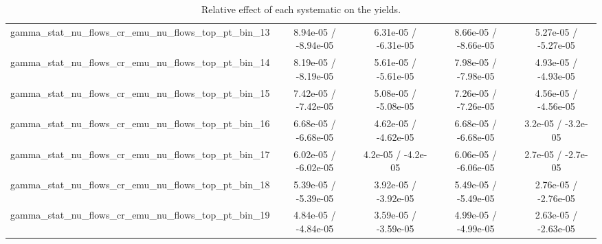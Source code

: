 \documentclass[10pt]{article}
\begin{document}
\begin{table}[htbp]
\begin{center}
\begin{tabular}{|c|c|c|c|c|}
  gamma_stat_nu_flows_cr_emu_nu_flows_top_pt_bin_13 & 8.94e-05 / -8.94e-05 & 6.31e-05 / -6.31e-05 & 8.66e-05 / -8.66e-05 & 5.27e-05 / -5.27e-05 \\ 
  gamma_stat_nu_flows_cr_emu_nu_flows_top_pt_bin_14 & 8.19e-05 / -8.19e-05 & 5.61e-05 / -5.61e-05 & 7.98e-05 / -7.98e-05 & 4.93e-05 / -4.93e-05 \\ 
  gamma_stat_nu_flows_cr_emu_nu_flows_top_pt_bin_15 & 7.42e-05 / -7.42e-05 & 5.08e-05 / -5.08e-05 & 7.26e-05 / -7.26e-05 & 4.56e-05 / -4.56e-05 \\ 
  gamma_stat_nu_flows_cr_emu_nu_flows_top_pt_bin_16 & 6.68e-05 / -6.68e-05 & 4.62e-05 / -4.62e-05 & 6.68e-05 / -6.68e-05 & 3.2e-05 / -3.2e-05 \\ 
  gamma_stat_nu_flows_cr_emu_nu_flows_top_pt_bin_17 & 6.02e-05 / -6.02e-05 & 4.2e-05 / -4.2e-05 & 6.06e-05 / -6.06e-05 & 2.7e-05 / -2.7e-05 \\ 
  gamma_stat_nu_flows_cr_emu_nu_flows_top_pt_bin_18 & 5.39e-05 / -5.39e-05 & 3.92e-05 / -3.92e-05 & 5.49e-05 / -5.49e-05 & 2.76e-05 / -2.76e-05 \\ 
  gamma_stat_nu_flows_cr_emu_nu_flows_top_pt_bin_19 & 4.84e-05 / -4.84e-05 & 3.59e-05 / -3.59e-05 & 4.99e-05 / -4.99e-05 & 2.63e-05 / -2.63e-05 \\ 
\hline 
\end{tabular} 
\caption{Relative effect of each systematic on the yields.} 
\end{center} 
\end{table} 
\end{document}
